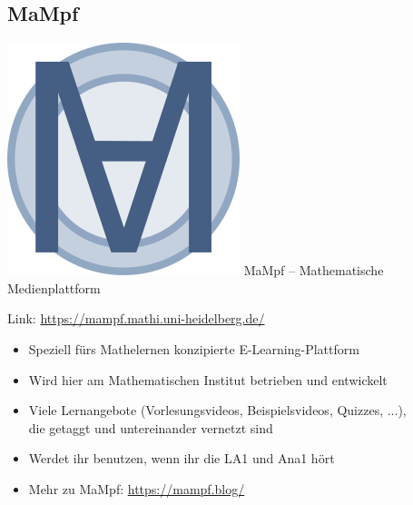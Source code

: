 \subsection{MaMpf}
\begin{frame}{\includegraphics[scale=0.072]{images/mampf.png} MaMpf -- Mathematische Medienplattform}
	
	Link: \url{https://mampf.mathi.uni-heidelberg.de/}
	
	\begin{itemize}
		\item Speziell fürs Mathelernen konzipierte E-Learning-Plattform
		\item Wird hier am Mathematischen Institut betrieben und entwickelt
		\item Viele Lernangebote (Vorlesungsvideos, Beispielsvideos, Quizzes, ...),\\
		die getaggt und untereinander vernetzt sind
		\item Werdet ihr benutzen, wenn ihr die LA1 und Ana1 hört
		\item Mehr zu MaMpf: \url{https://mampf.blog/}
	\end{itemize}
	
\end{frame}

